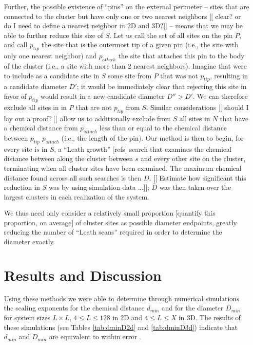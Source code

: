 \documentclass[pre,preprint]{revtex4}
\begin{document}
Further, the possible existence of ``pins'' on the external perimeter -- sites that are connected to the cluster but have only one or two nearest neighbors [[ clear? or do I need to define a nearest neighbor in 2D and 3D?]] -- means that we may be able to further reduce this size of $S$.  Let us call the set of all sites on the pin $P$, and call $p_{tip}$ the site that is the outermost tip of a given pin (i.e., the site with only one nearest neighbor) and $p_{attach}$ the site that attaches this pin to the body of the cluster (i.e., a site with more than 2 nearest neighbors).  Imagine that were to include as a candidate site in $S$ some site from $P$ that was not $p_{tip}$, resulting in a candidate diameter $D'$; it would be immediately clear that rejecting this site in favor of $p_{tip}$ would result in a new candidate diameter $D''>D'$.  We can therefore exclude all sites in in $P$ that are not $p_{tip}$ from $S$.  Similar considerations [[ should I lay out a proof? ]] allow us to additionally exclude from $S$ all sites in $N$ that have a chemical distance from $p_{attach}$ less than or equal to the chemical distance between $p_{tip}$ $p_{attach}$ (i.e., the length of the pin). Our method is then to begin, for every site i$s$ in $S$, a ``Leath growth'' [refs] search that examines the chemical distance between along the cluster between $s$ and every other site on the cluster, terminating when all cluster sites have been examined.  The maximum chemical distance found across all such searches is then $D$.   [[ Estimate how significant this reduction in $S$ was by using simulation data ...]]; $\bar{D}$ was then taken over the largest clusters in each realization of the system.

We thus need only consider a relatively small proportion [quantify this proportion, on average] of cluster sites as possible diameter endpoints, greatly reducing the number of ``Leath scans'' required in order to determine the diameter exactly.


\section{Results and Discussion}

Using these methods we were able to determine through numerical simulations the scaling exponents for the chemical distance $d_{min}$ and for the diameter $D_{min}$ for system sizes $L \times  L$, $4 \le L \le 128$ in 2D and   $4 \le L \le X$ in 3D.  The results of these simulations (see Tables \ref{tab:dminD2d} and \ref{tab:dminD3d}) indicate that $d_{min}$ and $D_{min}$ are equivalent to within error .  
\end{document}
